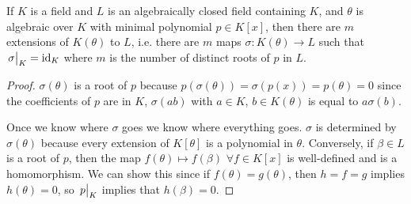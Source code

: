 \documentclass[a4paper,twoside,master.tex]{subfiles}
\begin{document}
\begin{claim}
    If $ K $ is a field and $ L $ is an algebraically closed field containing $ K $, and $ \theta $ is algebraic over $ K $ with minimal polynomial $ p \in K[x] $, then there are $ m $ extensions of $ K(\theta) $ to $ L $, i.e. there are $ m $ maps $ \sigma \colon K(\theta) \to L $ such that $ \eval{\sigma}_{K} = \text{id}_K $ where $ m $ is the number of distinct roots of $ p $ in $ L $. 
\end{claim}
\begin{proof}
    $ \sigma(\theta) $ is a root of $ p $ because $ p(\sigma(\theta)) = \sigma(p(x)) = p(\theta) = 0 $ since the coefficients of $ p $ are in $ K $, $ \sigma(a b) $ with $ a \in K $, $ b \in K(\theta) $ is equal to $ a \sigma(b) $.

    Once we know where $ \sigma $ goes we know where everything goes. $ \sigma $ is determined by $ \sigma(\theta) $ because every extension of $ K[\theta] $ is a polynomial in $\theta$. Conversely, if $ \beta \in L $ is a root of $ p $, then the map $ f(\theta) \mapsto f(\beta) $ $ \forall f \in K[x] $ is well-defined and is a homomorphism. We can show this since if $ f(\theta) = g(\theta) $, then $ h = f = g $ implies $ h(\theta) = 0 $, so $ \eval{p}_{K} $ implies that $ h(\beta) = 0 $.
\end{proof}
\end{document}
